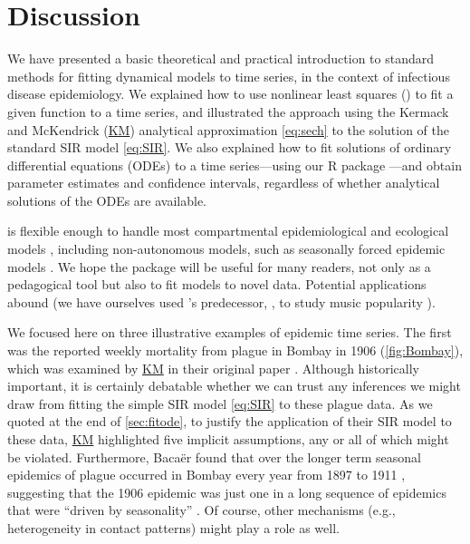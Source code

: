 \documentclass[]{interact}\usepackage[]{graphicx}\usepackage[]{xcolor}
\theoremstyle{plain}%
\theoremstyle{definition}
\theoremstyle{remark}
\newcommand{\KM}{\protect\hyperlink{cite.KermMcKe27}{KM}\xspace}
\newcommand{\code}[1]{\texttt{\detokenize{#1}}}
\begin{document}
\section{Discussion}

We have presented a basic theoretical and practical introduction to
standard methods for fitting dynamical models to time series, in the
context of infectious disease epidemiology.  We explained how to use
nonlinear least squares (\code{nls}) to fit a given function to a time
series, and illustrated the approach using the Kermack and McKendrick
(\KM) analytical approximation \eqref{eq:sech} to
the solution of the standard SIR model \eqref{eq:SIR}.  We also
explained how to fit solutions of ordinary differential equations
(ODEs) to a time series---using our R package \code{fitode}---and
obtain parameter estimates and confidence intervals, regardless of
whether analytical solutions of the ODEs are available.

\code{fitode} is flexible enough to handle most compartmental
epidemiological and ecological models
\citep{BrauCast01,BrauKrib16,Brau+19}, including non-autonomous
models, such as seasonally forced epidemic models
\citep{LondYork73,Earn+00,HeEarn07,HeEarn16,PapsEarn19}.  We hope the
package will be useful for many readers, not only as a pedagogical
tool but also to fit models to novel data.  Potential applications
abound (we have ourselves used \code{fitode}'s predecessor,
\code{fitsir}, to study music popularity \citep{Rosa+21}).

We focused here on three illustrative examples of epidemic time
series.  The first was the reported weekly mortality from plague in
Bombay in 1906 (\cref{fig:Bombay}), which was examined by \KM in their
original paper \citep{KermMcKe27}.  Although historically important,
it is certainly debatable whether we can trust any inferences we might
draw from fitting the simple SIR model \eqref{eq:SIR} to these plague
data.  As we quoted at the end of \cref{sec:fitode}, to justify the
application of their SIR model to these data, \KM highlighted five
implicit assumptions, any or all of which might be violated.
Furthermore, Baca\"er found that over the longer term seasonal
epidemics of plague occurred in Bombay every year from 1897 to 1911
\citep[Fig.\,2]{bacaermodel2012}, suggesting that the 1906 epidemic
was just one in a long sequence of epidemics that were ``driven by
seasonality'' \citep[p.\,403]{bacaermodel2012}.  Of course, other
mechanisms (e.g., heterogeneity in contact patterns) might play a role
as well.
\end{document}

